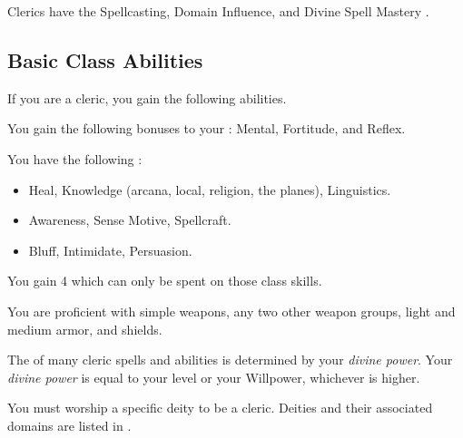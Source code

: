      Clerics have the Spellcasting, Domain Influence, and Divine Spell Mastery .

    \subsection{Basic Class Abilities}
        If you are a cleric, you gain the following abilities.

        You gain the following bonuses to your :  Mental,  Fortitude, and  Reflex.

        You have the following :
        \begin{itemize}
            \item {} Heal, Knowledge (arcana, local, religion, the planes), Linguistics.
            \item {} Awareness, Sense Motive, Spellcraft.
            \item {} Bluff, Intimidate, Persuasion.
        \end{itemize}
        You gain 4  which can only be spent on those class skills.

        You are proficient with simple weapons, any two other weapon groups, light and medium armor, and shields.

        The  of many cleric spells and abilities is determined by your \textit{divine power}.
        Your \textit{divine power} is equal to your level or your Willpower, whichever is higher.

        You must worship a specific deity to be a cleric.
        Deities and their associated domains are listed in .

